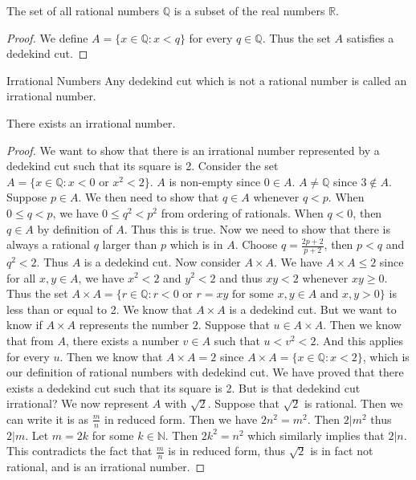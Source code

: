 \documentclass[a4paper]{article}
\begin{document}
\begin{prp}{}{} The set of all rational numbers $\mathbb{Q}$ is a subset of the real numbers $\mathbb{R}$. 
\end{prp}
\begin{proof} We define $A=\{x\in\mathbb{Q}:x<q\}$ for every $q\in\mathbb{Q}$. Thus the set $A$ satisfies a dedekind cut. 
\end{proof}

\begin{defn}{Irrational Numbers}{} Any dedekind cut which is not a rational number is called an irrational number. 
\end{defn}

\begin{thm}{}{} There exists an irrational number. \tcbline
\begin{proof} We want to show that there is an irrational number represented by a dedekind cut such that its square is 2. Consider the set $A=\{x\in\mathbb{Q}:x<0\text{ or }x^2<2\}$. $A$ is non-empty since $0\in A$. $A\neq\mathbb{Q}$ since $3\notin A$. Suppose $p\in A$. We then need to show that $q\in A$ whenever $q<p$. When $0\leq q<p$, we have $0\leq q^2<p^2$ from ordering of rationals. When $q<0$, then $q\in A$ by definition of $A$. Thus this is true. Now we need to show that there is always a rational $q$ larger than $p$ which is in $A$. Choose $q=\frac{2p+2}{p+2}$, then $p<q$ and $q^2<2$. Thus $A$ is a dedekind cut. \linebreak\linebreak
Now consider $A\times A$. We have $A\times A\leq 2$ since for all $x,y\in A$, we have $x^2<2$ and $y^2<2$ and thus $xy<2$ whenever $xy\geq 0$. Thus the set $A\times A=\{r\in\mathbb{Q}:r<0\text{ or }r=xy\text{ for some }x,y\in A\text{ and }x,y>0\}$ is less than or equal to 2. We know that $A\times A$ is a dedekind cut. But we want to know if $A\times A$ represents the number $2$. Suppose that $u\in A\times A$. Then we know that from $A$, there exists a number $v\in A$ such that $u<v^2<2$. And this applies for every $u$. Then we know that $A\times A=2$ since $A\times A=\{x\in\mathbb{Q}:x<2\}$, which is our definition of rational numbers with dedekind cut. \linebreak\linebreak
We have proved that there exists a dedekind cut such that its square is 2. But is that dedekind cut irrational? We now represent $A$ with $\sqrt2$. Suppose that $\sqrt2$ is rational. Then we can write it is as $\frac{m}{n}$ in reduced form. Then we have $2n^2=m^2$. Then $2|m^2$ thus $2|m$. Let $m=2k$ for some $k\in\mathbb{N}$. Then $2k^2=n^2$ which similarly implies that $2|n$. This contradicts the fact that $\frac{m}{n}$ is in reduced form, thus $\sqrt{2}$ is in fact not rational, and is an irrational number. 
\end{proof}
\end{thm}
\end{document}
